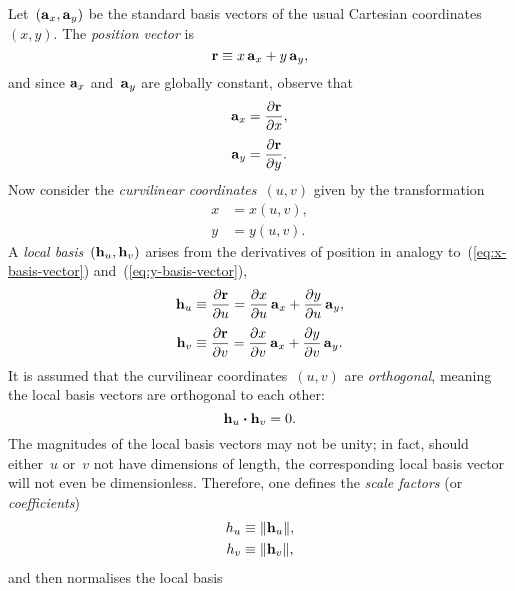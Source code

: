 Let~$(\mathop{}\!\boldsymbol{\mathrm{a}}_{x}, \mathop{}\!\boldsymbol{\mathrm{a}}_{y})$ be the standard basis vectors
of the usual Cartesian coordinates~$(x, y)$.
The \emph{position vector} is
\begin{equation}
  \boldsymbol{\mathrm{r}} \equiv x \mathop{}\!\boldsymbol{\mathrm{a}}_{x} + y \mathop{}\!\boldsymbol{\mathrm{a}}_{y},
  \label{eq:position-vector-cartesian}
\end{equation}
and since $\mathop{}\!\boldsymbol{\mathrm{a}}_{x}$ and~$\mathop{}\!\boldsymbol{\mathrm{a}}_{y}$ are globally constant,
observe that
\begin{align}
  \basisvec{x} &= \pder{\vec{r}}{x},
    \label{eq:x-basis-vector} \\[\fraclinespace]
  \basisvec{y} &= \pder{\vec{r}}{y}.
    \label{eq:y-basis-vector}
\end{align}
Now consider the \emph{curvilinear coordinates}~$(u, v)$
given by the transformation
\begin{align}
  x &= x (u, v), \label{eq:curvilinear-x-transformation} \\
  y &= y (u, v). \label{eq:curvilinear-y-transformation}
\end{align}
A \emph{local basis}~$(\mathop{}\!\boldsymbol{\mathrm{h}}_{u}, \mathop{}\!\boldsymbol{\mathrm{h}}_{v})$
arises from the derivatives of position
in analogy to~(\ref{eq:x-basis-vector}) and~(\ref{eq:y-basis-vector}),
\begin{align}
  \localvec{u} &
    \defeq \pder{\vec{r}}{u}
    = \pder{x}{u} \basisvec{x} + \pder{y}{u} \basisvec{y},
      \label{eq:u-local-basis-vector} \\[\fraclinespace]
  \localvec{v} &
    \defeq \pder{\vec{r}}{v}
    = \pder{x}{v} \basisvec{x} + \pder{y}{v} \basisvec{y}.
      \label{eq:v-local-basis-vector}
\end{align}
It is assumed that the curvilinear coordinates~$(u, v)$ are \emph{orthogonal},
meaning the local basis vectors are orthogonal to each other:
\begin{equation}
  \mathop{}\!\boldsymbol{\mathrm{h}}_{u} \boldsymbol{\cdot} \mathop{}\!\boldsymbol{\mathrm{h}}_{v} = 0.
  \label{eq:local-basis-orthogonal}
\end{equation}
The magnitudes of the local basis vectors may not be unity;
in fact, should either~$u$ or~$v$ not have dimensions of length,
the corresponding local basis vector will not even be dimensionless.
Therefore, one defines the \emph{scale factors}
(or \emph{\lame{} coefficients})
\begin{align}
  h_{u} &\equiv \lVert\mathop{}\!\boldsymbol{\mathrm{h}}_{u}\rVert, \label{eq:u-scale-factor} \\
  h_{v} &\equiv \lVert\mathop{}\!\boldsymbol{\mathrm{h}}_{v}\rVert, \label{eq:v-scale-factor}
\end{align}
and then normalises the local basis
